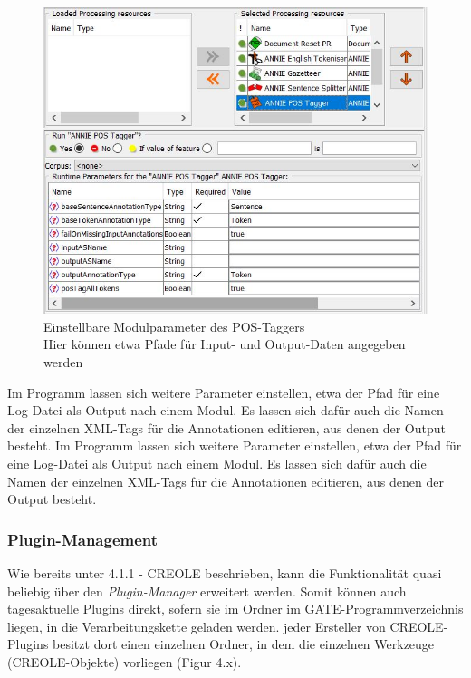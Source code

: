 \documentclass[12pt]{report}
\begin{document}
\begin{figure}[h!]
\begin{center}
\includegraphics[scale=1.0]{GATE_Bilder/POSTagger.jpg}
\caption{Einstellbare Modulparameter des POS-Taggers \\ Hier können etwa Pfade für Input- und Output-Daten angegeben werden}
\end{center}
\end{figure} 

Im Programm lassen sich weitere Parameter einstellen, etwa der Pfad für eine Log-Datei als Output nach einem Modul. Es lassen sich dafür auch die Namen der einzelnen XML-Tags für die Annotationen editieren, aus denen der Output besteht.
Im Programm lassen sich weitere Parameter einstellen, etwa der Pfad für eine Log-Datei als Output nach einem Modul. Es lassen sich dafür auch die Namen der einzelnen XML-Tags für die Annotationen editieren, aus denen der Output besteht.\\

\subsubsection{Plugin-Management}
Wie bereits unter 4.1.1 - CREOLE beschrieben, kann die Funktionalität quasi beliebig über den \textit{Plugin-Manager} erweitert werden. Somit können auch tagesaktuelle Plugins direkt, sofern sie im Ordner im GATE-Programmverzeichnis liegen, in die Verarbeitungskette geladen werden. jeder Ersteller von CREOLE-Plugins besitzt dort einen einzelnen Ordner, in dem die einzelnen Werkzeuge (CREOLE-Objekte) vorliegen (Figur 4.x). 
 
\end{document}
